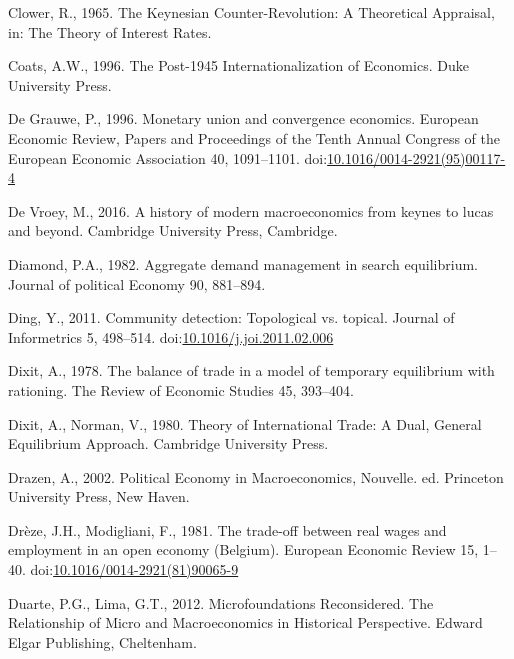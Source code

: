 \documentclass[
]{article}
\newlength{\cslhangindent}
\newlength{\cslentryspacingunit} %
\newenvironment{CSLReferences}[2] %
 {%
  \setlength{\parindent}{0pt}
  \ifodd #1
  \let\oldpar\par
  \def\par{\hangindent=\cslhangindent\oldpar}
  \fi
  \setlength{\parskip}{#2\cslentryspacingunit}
 }%
 {}
\begin{document}
\begin{CSLReferences}{1}{0}
\leavevmode{}%
Clower, R., 1965. The {Keynesian Counter-Revolution}: {A Theoretical
Appraisal}, in: The {Theory} of {Interest Rates}.

\leavevmode{}%
Coats, A.W., 1996. The Post-1945 Internationalization of Economics. Duke
University Press.

\leavevmode{}%
De Grauwe, P., 1996. Monetary union and convergence economics. European
Economic Review, Papers and {Proceedings} of the {Tenth Annual Congress}
of the {European Economic Association} 40, 1091--1101.
doi:\href{https://doi.org/10.1016/0014-2921(95)00117-4}{10.1016/0014-2921(95)00117-4}

\leavevmode{}%
De Vroey, M., 2016. A history of modern macroeconomics from keynes to
lucas and beyond. Cambridge University Press, Cambridge.

\leavevmode{}%
Diamond, P.A., 1982. Aggregate demand management in search equilibrium.
Journal of political Economy 90, 881--894.

\leavevmode{}%
Ding, Y., 2011. Community detection: {Topological} vs. topical. Journal
of Informetrics 5, 498--514.
doi:\href{https://doi.org/10.1016/j.joi.2011.02.006}{10.1016/j.joi.2011.02.006}

\leavevmode{}%
Dixit, A., 1978. The balance of trade in a model of temporary
equilibrium with rationing. The Review of Economic Studies 45, 393--404.

\leavevmode{}%
Dixit, A., Norman, V., 1980. Theory of {International Trade}: {A Dual},
{General Equilibrium Approach}. {Cambridge University Press}.

\leavevmode{}%
Drazen, A., 2002. Political {Economy} in {Macroeconomics}, Nouvelle. ed.
{Princeton University Press}, {New Haven}.

\leavevmode{}%
Drèze, J.H., Modigliani, F., 1981. The trade-off between real wages and
employment in an open economy ({Belgium}). European Economic Review 15,
1--40.
doi:\href{https://doi.org/10.1016/0014-2921(81)90065-9}{10.1016/0014-2921(81)90065-9}

\leavevmode{}%
Duarte, P.G., Lima, G.T., 2012. Microfoundations {Reconsidered}. {The
Relationship} of {Micro} and {Macroeconomics} in {Historical
Perspective}. {Edward Elgar Publishing}, {Cheltenham}.


\end{CSLReferences}
\end{document}
